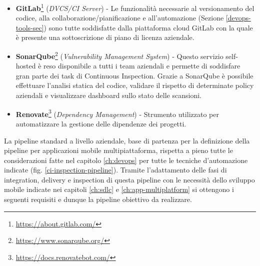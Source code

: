 \begin{itemize}
    \item \textbf{GitLab}\footnote{\href{https://about.gitlab.com/}{https://about.gitlab.com/}} (\textit{DVCS/CI Server}) - Le funzionalità necessarie al versionamento del codice, alla collaborazione/pianificazione e all'automazione (Sezione \ref{devops-tools-sec}) sono tutte soddisfatte dalla piattaforma cloud GitLab con la quale è presente una sottoscrizione di piano di licenza aziendale.
    
    \item \textbf{SonarQube}\footnote{\href{https://www.sonarqube.org/}{https://www.sonarqube.org/}} (\textit{Vulnerability Management System}) - Questo servizio self-hosted è reso disponibile a tutti i team aziendali e permette di soddisfare gran parte dei task di Continuous Inspection. Grazie a SonarQube è possibile effettuare l'analisi statica del codice, validare il rispetto di determinate policy aziendali e visualizzare dashboard sullo stato delle scansioni.
    
    \item \textbf{Renovate}\footnote{\href{https://docs.renovatebot.com/}{https://docs.renovatebot.com/}} (\textit{Dependency Management}) - Strumento utilizzato per automatizzare la gestione delle dipendenze dei progetti. 
\end{itemize}

La pipeline standard a livello aziendale, 
base di partenza per la definizione della pipeline per applicazioni mobile multipiattaforma, 
rispetta a pieno tutte le considerazioni fatte nel capitolo \ref{ch:devops} per tutte le tecniche d'automazione indicate (fig. \ref{ci-inspection-pipeline}). 
Tramite l'adattamento delle fasi di integration, delivery e inspection di questa pipeline con le necessità dello sviluppo mobile indicate nei capitoli \ref{ch:sdlc} e \ref{ch:app-multiplatform} si ottengono i seguenti requisiti e dunque la pipeline obiettivo da realizzare.

